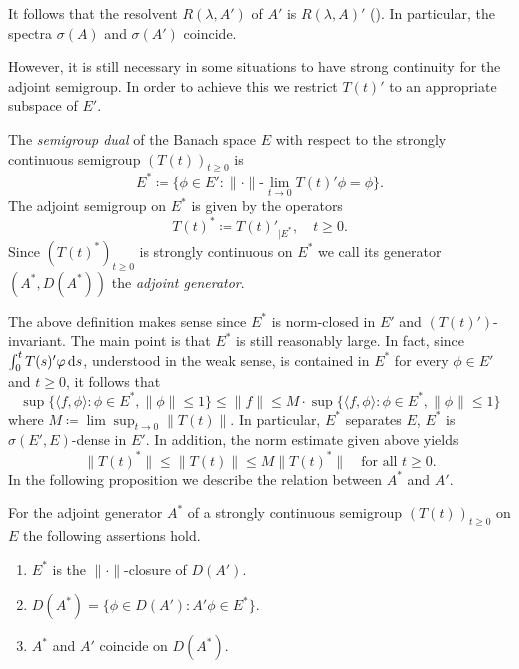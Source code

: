 It follows that the resolvent $R(\lambda,A')$ of\/ $A'$ is $R(\lambda,A)'$ 
(\textcite[Theorem~III.5.30]{kato:1976}).
In particular, the spectra $\sigma(A)$ and $\sigma(A')$ coincide.

However, it is still necessary in some situations to have strong continuity for the adjoint semigroup.
In order to achieve this we restrict $T(t)'$ to an appropriate subspace of\/ $E'$.
\begin{definition*}\label{def:a1-3.1}
The \emph{semigroup dual} of the Banach space $E$ with respect to the strongly continuous semigroup $(T(t))_{t \geq 0}$ is
\[
    E^{*} \coloneq \{\phi \in E' \colon \|\cdot\|\text{-}\lim_{t \to 0} T(t)'\phi = \phi\}.
\]
The adjoint semigroup on $E^{*}$ is given by the operators
\[
    T(t)^{*} \coloneq T(t)'_{ \vert E^{*}}, \quad t \geq 0.
\]
Since $(T(t)^{*})_{t \geq 0}$ is strongly continuous on $E^{*}$ we call its generator $(A^{*},D(A^{*}))$ the \emph{adjoint generator}.
\end{definition*}
The above definition makes sense since $E^{*}$ is norm-closed in $E'$ and $(T(t)')$-invariant.
The main point is that $E^{*}$ is still reasonably large.
In fact, since $\int_{0}^{t} T(s)'\phi  \ds$, understood in the weak sense, is contained in $E^{*}$ for every $\phi \in E'$ and $t \geq 0$, it follows that
\[
    \sup\{\langle f,\phi \rangle \colon \phi \in E^{*}, \|\phi\| \leq 1\} \leq \|f\| \leq M\cdot\sup\{\langle f,\phi \rangle \colon \phi \in E^{*}, \|\phi\| \leq1\}
\]
where $M \coloneq \lim\sup_{t \to 0} \|T(t)\|$.
In particular, $E^{*}$ separates $E$, \ie $E^{*}$ is $\sigma(E',E)$-dense in $E'$.
In addition, the norm estimate given above yields
\[
    \|T(t)^{*}\| \leq \|T(t)\| \leq M\|T(t)^{*}\| \quad \text{for all } t \geq 0.
\]
In the following proposition we describe the relation between $A^{*}$ and $A'$.
\begin{proposition*}\label{prop:a1-3.4}
For the adjoint generator $A^{*}$ of a strongly continuous semigroup $(T(t))_{t \geq 0}$ on $E$ the following assertions hold.
\begin{enumerate}[\upshape(i)]
\item 
$E^{*}$ is the $\|\cdot\|$-closure of\/ $D(A')$.

\item 
$D(A^{*}) = \{\phi \in D(A') \colon A'\phi \in E^{*}\}$.

\item 
$A^{*}$ and $A'$ coincide on $D(A^{*})$.
\end{enumerate}
\end{proposition*}
